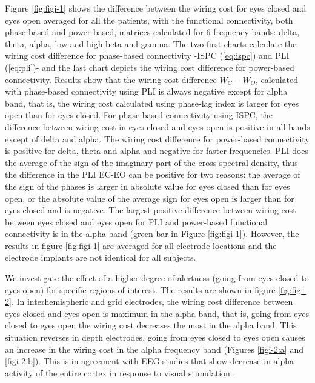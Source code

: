 \documentclass[11pt, onecolumn]{article}
\begin{document}
Figure \ref{fig:figi-1} shows the difference between the wiring cost for eyes closed and eyes open averaged for all the patients, with the functional connectivity, both phase-based and power-based, matrices calculated for 6 frequency bands: delta, theta, alpha, low and high beta and gamma. 
The two first charts calculate the wiring cost difference for phase-based connectivity -ISPC (\ref{eq:ispc}) and PLI (\ref{eq:pli})- and the last chart depicts the wiring cost difference for power-based connectivity. 
Results show that the wiring cost difference $W_C - W_O$, calculated with phase-based connectivity using PLI is always negative except for alpha band, that is, the wiring cost calculated using phase-lag index is larger for eyes open than for eyes closed. For phase-based connectivity using ISPC, the difference between wiring cost in eyes closed and eyes open is positive in all bands except of delta and alpha. The wiring cost difference for power-based connectivity is positive for delta, theta and alpha and negative for faster frequencies. PLI does the average of the sign of the imaginary part of the cross spectral density, thus the difference in the PLI EC-EO can be positive for two reasons: the average of the sign of the phases is larger in absolute value for eyes closed than for eyes open, or the absolute value of the average sign for eyes open is larger than for eyes closed and is negative.
The largest positive difference between wiring cost between eyes closed and eyes open for PLI and power-based functional connectivity is in the alpha band (green bar in Figure \ref{fig:figi-1}).
However, the results in figure \ref{fig:figi-1} are averaged for all electrode locations and the electrode implants are not identical for all subjects. 

We investigate the effect of a higher degree of alertness (going from eyes closed to eyes open) for specific regions of interest. The results are shown in figure \ref{fig:figi-2}. In interhemispheric and grid electrodes, the wiring cost difference between eyes closed and eyes open is maximum in the alpha band, that is, going from eyes closed to eyes open the wiring cost decreases the most in the alpha band. 
This situation reverses in depth electrodes, going from eyes closed to eyes open causes an increase in the wiring cost in the alpha frequency band (Figures \ref{figi-2:a} and \ref{figi-2:b}). This is in agreement with EEG studies that show decrease in alpha activity of the entire cortex in response to visual stimulation \citep{barry2007eeg}.
\end{document}
